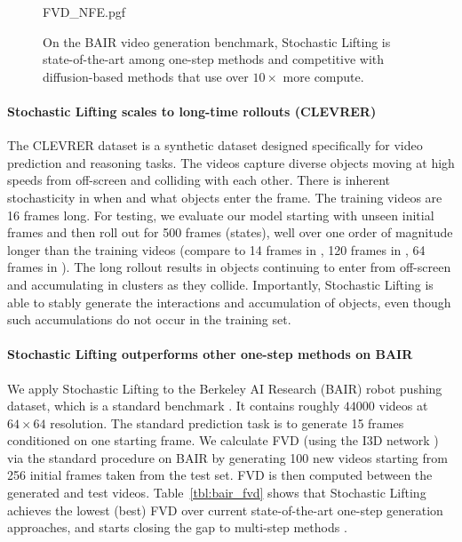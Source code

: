 \documentclass{article}
\theoremstyle{plain}
\theoremstyle{definition}
\theoremstyle{remark}
\begin{document}
\begin{figure}
  \begin{center}{FVD_NFE.pgf}
  \end{center}
  \caption{On the BAIR video generation benchmark, Stochastic Lifting is state-of-the-art among one-step methods and competitive with diffusion-based methods that use over $10\times$ more compute.}
\end{figure}



\vspace*{-0.15cm}\paragraph{Stochastic Lifting scales to long-time rollouts (CLEVRER)}
The CLEVRER dataset \cite{Yi2020CLEVRER} is a synthetic dataset designed specifically for video prediction and reasoning tasks. The videos capture diverse objects moving at high speeds from off-screen and colliding with each other. There is inherent stochasticity in when and what objects enter the frame. The training videos are 16 frames long. For testing, we evaluate our model starting with unseen initial frames and then roll out for 500 frames (states), well over one order of magnitude longer than the training videos (compare to 14 frames in \cite{chen2024probabilistic}, 120 frames in \cite{davtyan2023efficientRIVER}, 64 frames in \cite{Mei_Patel_2023}). The long rollout results in objects continuing to enter from off-screen and accumulating in clusters as they collide. Importantly, Stochastic Lifting is able to stably generate the interactions and accumulation of objects, even though such accumulations do not occur in the training set.

\vspace*{-0.15cm}\paragraph{Stochastic Lifting outperforms other one-step methods on BAIR} We apply Stochastic Lifting to the Berkeley AI Research (BAIR) robot pushing dataset, which is a standard benchmark \cite{pmlr-v78-frederikebert17a}. It contains roughly $44000$ videos at $64 \times 64$ resolution. The standard prediction task is to generate 15 frames conditioned on one starting frame. We calculate FVD (using the I3D network \cite{I3netcarreira2017quo}) via the standard procedure on BAIR by generating 100 new videos starting from 256 initial frames taken from the test set. FVD is then computed between the generated and test videos. Table~\ref{tbl:bair_fvd} shows that Stochastic Lifting achieves the lowest (best) FVD \cite{unterthiner2018towardsFVD} over current state-of-the-art one-step generation approaches, and starts closing the gap to multi-step methods \cite{ruhe2024rolling}.
\end{document}
